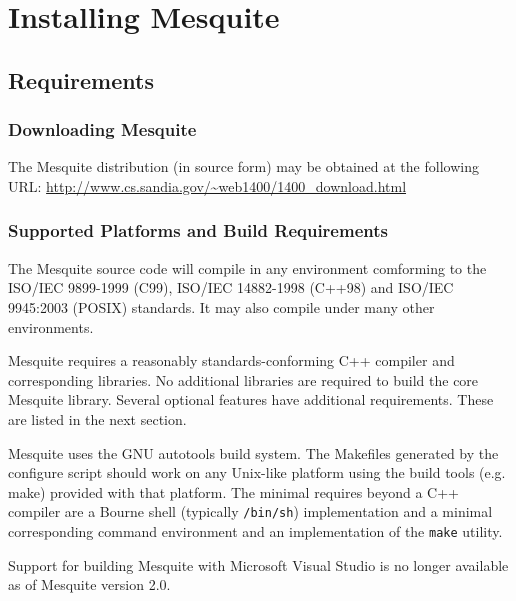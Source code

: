 \chapter{Installing Mesquite} \label{sec:install}

\section{Requirements}

\subsection{Downloading Mesquite}
The Mesquite distribution (in source form) may be obtained at the following URL:
\url{http://www.cs.sandia.gov/~web1400/1400_download.html}

\subsection{Supported Platforms and Build Requirements}
The Mesquite source code will compile in any environment comforming to the ISO/IEC 9899-1999 (C99), ISO/IEC 14882-1998 (C++98) and ISO/IEC 9945:2003 (POSIX) standards. It may also compile under many other environments.

Mesquite requires a reasonably standards-conforming C++ compiler and corresponding libraries.  No additional libraries are required to build the core Mesquite library. Several optional features have additional requirements.  These are listed in the next section.

Mesquite uses the GNU autotools build system.  The Makefiles generated by the
configure script should work on any Unix-like platform using the build tools
(e.g. make) provided with that platform.  The minimal requires beyond a C++
compiler are a Bourne shell (typically \texttt{/bin/sh}) implementation and
a minimal corresponding command environment and an implementation of the \texttt{make} utility.

Support for building Mesquite with Microsoft Visual Studio is no longer
available as of Mesquite version 2.0.  


